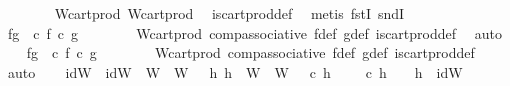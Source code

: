 \begin{isabellebody}
\ \ \ \ \ \ \isamarkupfalse%
\ W{\isacharprime}{\kern0pt}{\isacharunderscore}{\kern0pt}cart{\isacharunderscore}{\kern0pt}prod\ W{\isacharunderscore}{\kern0pt}cart{\isacharunderscore}{\kern0pt}prod\ \isamarkupfalse%
\ is{\isacharunderscore}{\kern0pt}cart{\isacharunderscore}{\kern0pt}prod{\isacharunderscore}{\kern0pt}def\ \isamarkupfalse%
\ {\isacharparenleft}{\kern0pt}metis\ fstI\ sndI{\isacharparenright}{\kern0pt}\isanewline
\isanewline
\ \ \isamarkupfalse%
\ fg{}{\isacharcolon}{\kern0pt}\ {\isachardoublequoteopen}{\isasympi}{\isacharprime}{\kern0pt}\ {\isasymcirc}\isactrlsub c\ {\isacharparenleft}{\kern0pt}f\ {\isasymcirc}\isactrlsub c\ g{\isacharparenright}{\kern0pt}\ {\isacharequal}{\kern0pt}\ {\isasympi}{\isacharprime}{\kern0pt}\isanewline
\ \ \ \ \isamarkupfalse%
\ W{\isacharprime}{\kern0pt}{\isacharunderscore}{\kern0pt}cart{\isacharunderscore}{\kern0pt}prod\ comp{\isacharunderscore}{\kern0pt}associative{}\ f{\isacharunderscore}{\kern0pt}def\ g{\isacharunderscore}{\kern0pt}def\ is{\isacharunderscore}{\kern0pt}cart{\isacharunderscore}{\kern0pt}prod{\isacharunderscore}{\kern0pt}def\ \isamarkupfalse%
\ auto\isanewline
\ \ \isamarkupfalse%
\ fg{}{\isacharcolon}{\kern0pt}\ {\isachardoublequoteopen}{\isasympi}{\isacharprime}{\kern0pt}\ {\isasymcirc}\isactrlsub c\ {\isacharparenleft}{\kern0pt}f\ {\isasymcirc}\isactrlsub c\ g{\isacharparenright}{\kern0pt}\ {\isacharequal}{\kern0pt}\ {\isasympi}{\isacharprime}{\kern0pt}\isanewline
\ \ \ \ \isamarkupfalse%
\ W{\isacharprime}{\kern0pt}{\isacharunderscore}{\kern0pt}cart{\isacharunderscore}{\kern0pt}prod\ comp{\isacharunderscore}{\kern0pt}associative{}\ f{\isacharunderscore}{\kern0pt}def\ g{\isacharunderscore}{\kern0pt}def\ is{\isacharunderscore}{\kern0pt}cart{\isacharunderscore}{\kern0pt}prod{\isacharunderscore}{\kern0pt}def\ \isamarkupfalse%
\ auto\isanewline
\isanewline
\ \ \isamarkupfalse%
\ idW{\isacharprime}{\kern0pt}\ \ {\isachardoublequoteopen}idW{\isacharprime}{\kern0pt}\ {\isacharcolon}{\kern0pt}\ W{\isacharprime}{\kern0pt}\ {\isasymrightarrow}\ W{\isacharprime}{\kern0pt}\ {\isasymand}\ {\isacharparenleft}{\kern0pt}{\isasymforall}\ h{}{\isachardot}{\kern0pt}\ {\isacharparenleft}{\kern0pt}h{}\ {\isacharcolon}{\kern0pt}\ W{\isacharprime}{\kern0pt}\ {\isasymrightarrow}\ W{\isacharprime}{\kern0pt}\ {\isasymand}\ {\isasympi}{\isacharprime}{\kern0pt}\ {\isasymcirc}\isactrlsub c\ h{}\ {\isacharequal}{\kern0pt}\ {\isasympi}{\isacharprime}{\kern0pt}\ {\isasymand}\ {\isasympi}{\isacharprime}{\kern0pt}\ {\isasymcirc}\isactrlsub c\ h{}\ {\isacharequal}{\kern0pt}\ {\isasympi}{\isacharprime}{\kern0pt}\ {\isasymlongrightarrow}\ h{}\ {\isacharequal}{\kern0pt}\ idW{\isacharprime}{\kern0pt}{\isacharparenright}{\kern0pt}{\isachardoublequoteclose}\isanewline

\end{isabellebody}
